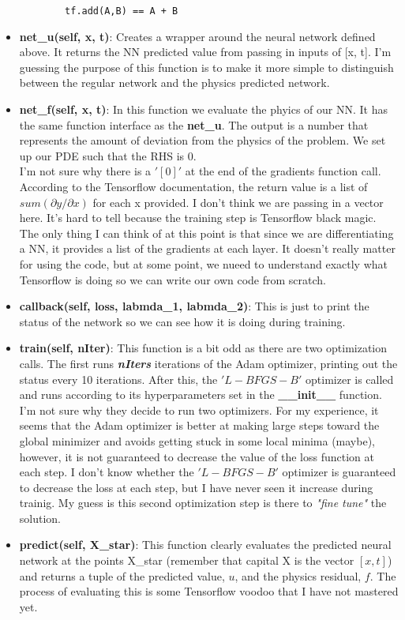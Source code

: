 \documentclass[10pt]{article}
\begin{document}
\begin{itemize}
    \begin{lstlisting}
        tf.add(A,B) == A + B
    \end{lstlisting}
    
    \item \textbf{net\_u(self, x, t)}: Creates a wrapper around the neural network defined above. It returns the NN predicted value from passing in inputs of [x, t]. I'm guessing the purpose of this function is to make it more simple to distinguish between the regular network and the physics predicted network.
    
    \item \textbf{net\_f(self, x, t)}: In this function we evaluate the phyics of our NN. It has the same function interface as the \textbf{net\_u}. The output is a number that represents the amount of deviation from the physics of the problem. We set up our PDE such that the RHS is 0. \\
    I'm not sure why there is a $'[0]'$ at the end of the gradients function call. According to the Tensorflow documentation, the return value is a list of $sum(\partial y / \partial x)$ for each x provided. I don't think we are passing in a vector here. It's hard to tell because the training step is Tensorflow black magic. The only thing I can think of at this point is that since we are differentiating a NN, it provides a list of the gradients at each layer. It doesn't really matter for using the code, but at some point, we nueed to understand exactly what Tensorflow is doing so we can write our own code from scratch.
    
    \item \textbf{callback(self, loss, labmda\_1, labmda\_2)}: This is just to print the status of the network so we can see how it is doing during training.
    
    \item \textbf{train(self, nIter)}: This function is a bit odd as there are two optimization calls. The first runs \textbf{\textit{nIters}} iterations of the Adam optimizer, printing out the status every 10 iterations. After this, the $'L-BFGS-B'$ optimizer is called and runs according to its hyperparameters set in the \textbf{\_\_init\_\_} function. I'm not sure why they decide to run two optimizers. For my experience, it seems that the Adam optimizer is better at making large steps toward the global minimizer and avoids getting stuck in some local minima (maybe), however, it is not guaranteed to decrease the value of the loss function at each step. I don't know whether the $'L-BFGS-B'$ optimizer is guaranteed to decrease the loss at each step, but I have never seen it increase during trainig. My guess is this second optimization step is there to \textit{"fine tune"} the solution. 
    
    \item \textbf{predict(self, X\_star)}: This function clearly evaluates the predicted neural network at the points X\_star (remember that capital X is the vector $[x, t]$) and returns a tuple of the predicted value, $u$, and the physics residual, $f$. The process of evaluating this is some Tensorflow voodoo that I have not mastered yet.

\end{itemize}
	
\end{document}
